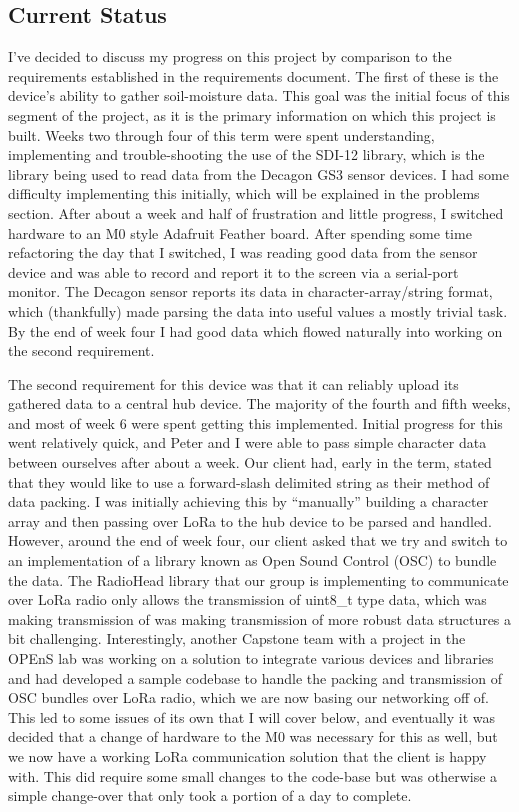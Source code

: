 \documentclass[onecolumn, draftclsnofoot,10pt, compsoc]{IEEEtran}
\begin{document}
    \subsection{Current Status}%
    I've decided to discuss my progress on this project by comparison to the requirements established in the requirements document.
    The first of these is the device’s ability to gather soil-moisture data.
This goal was the initial focus of this segment of the project, as it is the primary information on which this project is built.
Weeks two through four of this term were spent understanding, implementing and trouble-shooting the use of the SDI-12 library, which is the library being used to read data from the Decagon GS3 sensor devices.
I had some difficulty implementing this initially, which will be explained in the problems section.
After about a week and half of frustration and little progress, I switched hardware to an M0 style Adafruit Feather board.
After spending some time refactoring the day that I switched, I was reading good data from the sensor device and was able to record and report it to the screen via a serial-port monitor.
The Decagon sensor reports its data in character-array/string format, which (thankfully) made parsing the data into useful values a mostly trivial task.
By the end of week four I had good data which flowed naturally into working on the second requirement.

The second requirement for this device was that it can reliably upload its gathered data to a central hub device.
The majority of the fourth and fifth weeks, and most of week 6 were spent getting this implemented.
Initial progress for this went relatively quick, and Peter and I were able to pass simple character data between ourselves after about a week.
Our client had, early in the term, stated that they would like to use a forward-slash delimited string as their method of data packing.
I was initially achieving this by “manually” building a character array and then passing over LoRa to the hub device to be parsed and handled.
However, around the end of week four, our client asked that we try and switch to an implementation of a library known as Open Sound Control (OSC) to bundle the data.
The RadioHead library that our group is implementing to communicate over LoRa radio only allows the transmission of uint8\_t type data, which was making transmission of was making transmission of more robust data structures a bit challenging.
Interestingly, another Capstone team with a project in the OPEnS lab was working on a solution to integrate various devices and libraries and had developed a sample codebase to handle the packing and transmission of OSC bundles over LoRa radio, which we are now basing our networking off of.
This led to some issues of its own that I will cover below, and eventually it was decided that a change of hardware to the M0 was necessary for this as well, but we now have a working LoRa communication solution that the client is happy with.
This did require some small changes to the code-base but was otherwise a simple change-over that only took a portion of a day to complete.
\end{document}
